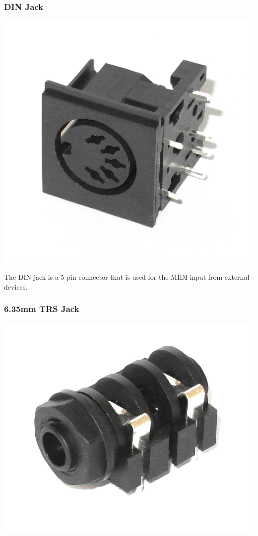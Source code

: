 \documentclass{scrartcl}
\begin{document}
\subsubsection{DIN Jack}

\begin{center}
    \includegraphics[scale=0.15]{assets/zekit-din.jpg}
\end{center}

The DIN jack is a 5-pin connector that is used for the MIDI input from external devices.

\subsubsection{6.35mm TRS Jack}

\begin{center}
    \includegraphics[scale=0.15]{assets/zekit-jack.jpg}
\end{center}
\end{document}
